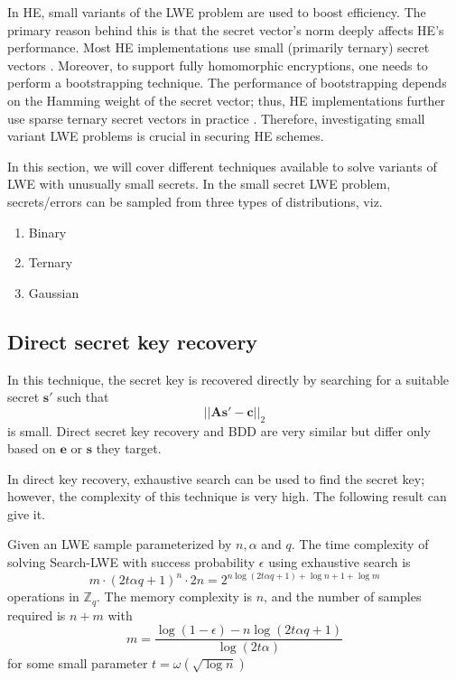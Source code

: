 In HE, small variants of the LWE problem are used to boost efficiency. The primary reason behind this is that the secret vector's norm deeply affects HE's performance. Most HE implementations use small (primarily ternary) secret vectors \cite{halevi2013design,laine2016simple,Kim18}. Moreover, to support fully homomorphic encryptions, one needs to perform a bootstrapping technique. The performance of bootstrapping depends on the Hamming weight of the secret vector; thus, HE implementations further use sparse ternary secret vectors in practice \cite{halevi2021bootstrapping,chen2018homomorphic,cheon2018bootstrapping}. Therefore, investigating small variant LWE problems is crucial in securing HE schemes.


In this section, we will cover different techniques available to solve variants of LWE with unusually small secrets. In the small secret LWE problem, secrets/errors can be sampled from three types of distributions, viz.
\begin{enumerate}
    \item Binary
    \item Ternary
    \item Gaussian
\end{enumerate}






\subsection{Direct secret key recovery}
In this technique, the secret key is recovered directly by searching for a suitable secret $\textbf{s}'$ such that
\begin{equation*}
    ||\textbf{As}'-\textbf{c}||_2
\end{equation*}
is small. Direct secret key recovery and BDD are very similar but differ only based on $\textbf{e}$ or $\textbf{s}$ they target.

In direct key recovery, exhaustive search can be used to find the secret key; however, the complexity of this technique is very high. The following result can give it.

\begin{theorem} \cite{c54b603f579b48a08b698bde47b71455}
    Given an LWE sample parameterized by $n,\alpha$ and $q$. The time complexity of solving Search-LWE with success probability $\epsilon$ using exhaustive search is
    \begin{equation*}
        m \cdot (2t\alpha q +1)^n \cdot 2n = 2^{n\log{(2t\alpha q +1)+ \log{n} + 1 + \log{m}}}
    \end{equation*}
    operations in $\mathbb{Z}_q$. The memory complexity is $n$, and the number of samples required is $n+m$ with
    \begin{equation*}
        m=\frac{\log{(1-\epsilon)}-n\log{(2t\alpha q+1)}}{\log{(2t\alpha)}}
    \end{equation*}
    for some small parameter $t=\omega(\sqrt{\log{n}})$
\end{theorem}




